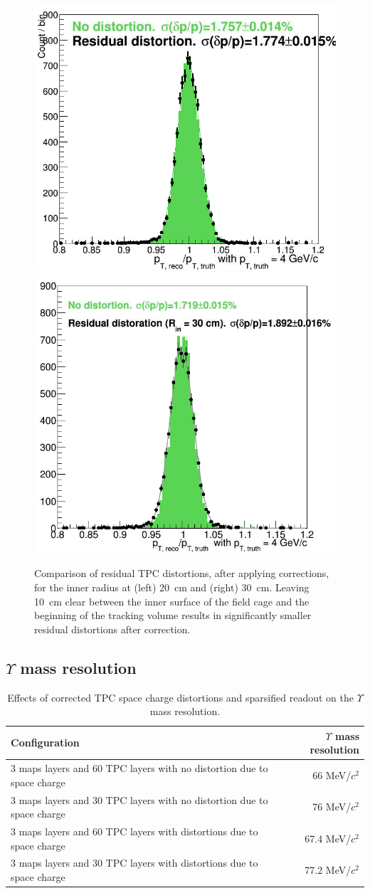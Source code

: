 \begin{figure}[hbt]
  \centering
  \includegraphics[width=0.4\linewidth]{figs/tpc_residual_correction_20cm}
  \hspace{0.1\linewidth}
  \includegraphics[width=0.4\linewidth]{figs/tpc_residual_correction_30cm}
  \caption{Comparison of residual TPC distortions, after applying
    corrections, for the inner radius at (left) 20~cm and (right)
    30~cm. Leaving 10~cm clear between the inner surface of the field
    cage and the beginning of the tracking volume results in
    significantly smaller residual distortions after correction.}
  \label{fig:tpc_residuals}
\end{figure}

\subsection{$\Upsilon$ mass resolution}


\begin{table}
  \centering
  \begin{tabular}{lr}
    \toprule
    Configuration & $\Upsilon$ mass resolution \\
    \midrule
3 maps layers and 60 TPC layers with no distortion due to space charge
&  66 MeV/$c^2$ \\
3 maps layers and 30 TPC layers with no distortion due to space charge
& 76 MeV/$c^2$ \\
3 maps layers and 60 TPC layers with distortions due to space charge
& 67.4 MeV/$c^2$ \\
3 maps layers and 30 TPC layers with distortions due to space charge
& 77.2 MeV/$c^2$ \\
    \bottomrule
  \end{tabular}
  \caption{Effects of corrected TPC space charge distortions and sparsified readout on the $\Upsilon$ mass resolution.}
  \label{tab:upsilon_mass_resolution}
\end{table}



